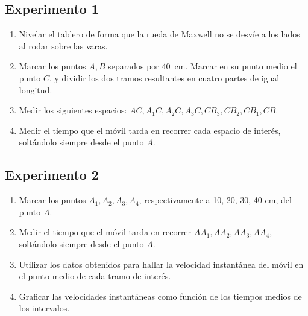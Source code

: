 \documentclass[../main]{subfiles}
\begin{document}
\subsection{Experimento 1}
\begin{enumerate}
  \item Nivelar el tablero de forma que la rueda de Maxwell no se desvíe a los lados al rodar sobre las varas.
  \item Marcar los puntos $A, B$ separados por \qty{40}{\cm}.
    Marcar en su punto medio el punto $C$, y dividir los dos tramos resultantes en cuatro partes de igual longitud.
  \item Medir los siguientes espacios: $AC, A_1C, A_2C, A_3C, CB_3, CB_2, CB_1, CB$.
  \item Medir el tiempo que el móvil tarda en recorrer cada espacio de interés, soltándolo siempre desde el punto $A$.
\end{enumerate}
\subsection{Experimento 2}
\begin{enumerate}
  \item Marcar los puntos $A_1, A_2, A_3, A_4$, respectivamente a 10, 20, 30, 40 \unit{\cm}, del punto $A$.
  \item Medir el tiempo que el móvil tarda en recorrer $AA_1, AA_2, AA_3, AA_4$, soltándolo siempre desde el punto $A$.
  \item Utilizar los datos obtenidos para hallar la velocidad instantánea del móvil en el punto medio de cada tramo de interés.
  \item Graficar las velocidades instantáneas como función de los tiempos medios de los intervalos.
\end{enumerate}
\end{document}

